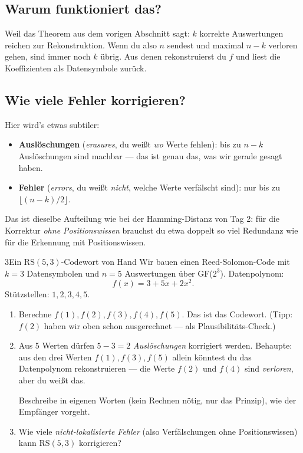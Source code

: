 \subsection*{Warum funktioniert das?}

Weil das Theorem aus dem vorigen Abschnitt sagt: $k$ korrekte
Auswertungen reichen zur Rekonstruktion. Wenn du also $n$ sendest und
maximal $n - k$ verloren gehen, sind immer noch $k$ übrig. Aus denen
rekonstruierst du $f$ und liest die Koeffizienten als Datensymbole
zurück.

\subsection*{Wie viele Fehler korrigieren?}

Hier wird's etwas subtiler:

\begin{itemize}
\item \textbf{Auslöschungen} (\emph{erasures}, du weißt \emph{wo}
  Werte fehlen): bis zu $n - k$ Auslöschungen sind machbar — das ist
  genau das, was wir gerade gesagt haben.
\item \textbf{Fehler} (\emph{errors}, du weißt \emph{nicht}, welche
  Werte verfälscht sind): nur bis zu $\lfloor (n - k) / 2 \rfloor$.
\end{itemize}

Das ist dieselbe Aufteilung wie bei der Hamming-Distanz von Tag 2:
für die Korrektur \emph{ohne Positionswissen} brauchst du etwa doppelt
so viel Redundanz wie für die Erkennung mit Positionswissen.

\begin{bleistiftuebung}{3}{Ein RS$(5, 3)$-Codewort von Hand}
Wir bauen einen Reed-Solomon-Code mit $k = 3$ Datensymbolen und
$n = 5$ Auswertungen über GF($2^3$). Datenpolynom:
\[
  f(x) = 3 + 5x + 2x^2.
\]
Stützstellen: $1, 2, 3, 4, 5$.

\begin{enumerate}[label=(\alph*), leftmargin=*]
\item Berechne $f(1), f(2), f(3), f(4), f(5)$. Das ist das Codewort.
  (Tipp: $f(2)$ haben wir oben schon ausgerechnet — als
  Plausibilitäts-Check.)

\item Aus 5 Werten dürfen $5 - 3 = 2$ \emph{Auslöschungen} korrigiert
  werden. Behaupte: aus den drei Werten $f(1), f(3), f(5)$ allein
  könntest du das Datenpolynom rekonstruieren — die Werte $f(2)$ und
  $f(4)$ sind \emph{verloren}, aber du weißt das.

  Beschreibe in eigenen Worten (kein Rechnen nötig, nur das Prinzip),
  wie der Empfänger vorgeht.

\item Wie viele \emph{nicht-lokalisierte Fehler} (also Verfälschungen
  ohne Positionswissen) kann RS$(5, 3)$ korrigieren?
\end{enumerate}
\end{bleistiftuebung}

